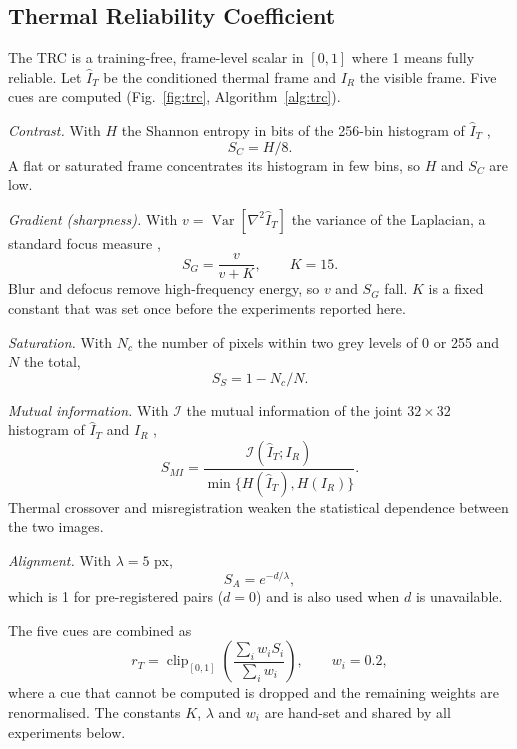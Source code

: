\documentclass[journal]{IEEEtran}
\newcommand{\rT}{r_T}
\begin{document}
\subsection{Thermal Reliability Coefficient}\label{sec:trc}
The TRC is a training-free, frame-level scalar in $[0,1]$ where 1 means fully reliable. Let $\hat I_T$ be the conditioned thermal frame and $I_R$ the visible frame. Five cues are computed (Fig.~\ref{fig:trc}, Algorithm~\ref{alg:trc}).

\emph{Contrast.} With $H$ the Shannon entropy in bits of the 256-bin histogram of $\hat I_T$ \cite{shannon},
\begin{equation}
S_C = H/8 .
\end{equation}
A flat or saturated frame concentrates its histogram in few bins, so $H$ and $S_C$ are low.

\emph{Gradient (sharpness).} With $v=\operatorname{Var}\!\left[\nabla^2 \hat I_T\right]$ the variance of the Laplacian, a standard focus measure \cite{pech},
\begin{equation}
S_G = \frac{v}{v+K},\qquad K=15 .
\end{equation}
Blur and defocus remove high-frequency energy, so $v$ and $S_G$ fall. $K$ is a fixed constant that was set once before the experiments reported here.

\emph{Saturation.} With $N_c$ the number of pixels within two grey levels of 0 or 255 and $N$ the total,
\begin{equation}
S_S = 1 - N_c/N .
\end{equation}

\emph{Mutual information.} With $\mathcal{I}$ the mutual information of the joint $32\times32$ histogram of $\hat I_T$ and $I_R$ \cite{viola},
\begin{equation}
S_{MI} = \frac{\mathcal{I}(\hat I_T;I_R)}{\min\{H(\hat I_T),H(I_R)\}} .
\end{equation}
Thermal crossover and misregistration weaken the statistical dependence between the two images.

\emph{Alignment.} With $\lambda=5$ px,
\begin{equation}
S_A = e^{-d/\lambda},
\end{equation}
which is 1 for pre-registered pairs ($d=0$) and is also used when $d$ is unavailable.

The five cues are combined as
\begin{equation}
\rT = \operatorname{clip}_{[0,1]}\!\left(\frac{\sum_{i}w_i S_i}{\sum_{i}w_i}\right),\qquad w_i=0.2 ,
\label{eq:trc}
\end{equation}
where a cue that cannot be computed is dropped and the remaining weights are renormalised. The constants $K$, $\lambda$ and $w_i$ are hand-set and shared by all experiments below.
\end{document}

